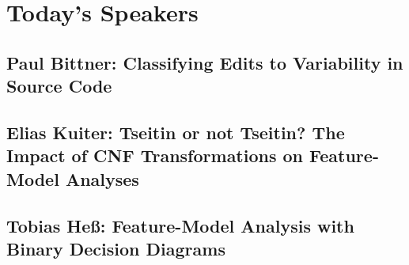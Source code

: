 \documentclass[
	aspectratio=169, %
	8pt, %
]{beamer}
\subtitle{13. Current Research Topics}
\author{Elias Kuiter, Thomas Thüm, Timo Kehrer}
\begin{document}


\begin{frame}{\inserttitle}
	\lectureseriesoverview[13]
\end{frame}

\section{Today's Speakers}

\subsection{Paul Bittner: Classifying Edits to Variability in Source Code}
\subsection{Elias Kuiter: Tseitin or not Tseitin? The Impact of CNF Transformations on Feature-Model Analyses}
\subsection{Tobias Heß: Feature-Model Analysis with Binary Decision Diagrams}
\end{document}
